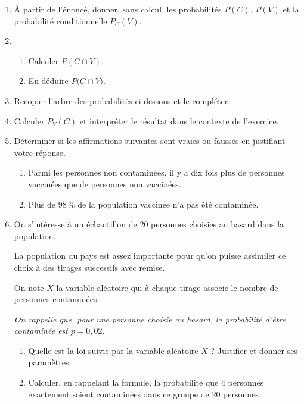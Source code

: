 \begin{enumerate}
	\item À partir de l'énoncé, donner, sans calcul, les probabilités $P(C)$, $P(V)$ et la probabilité conditionnelle $P_C(V)$.
	\item
	\begin{enumerate}
		\item Calculer $P(C \cap V)$.
		\item En déduire $P\big(\overline{C} \cap V\big)$.
	\end{enumerate}
	\item Recopier l'arbre des probabilités ci-dessous et le compléter.
	
	\begin{Centrage}
	\end{Centrage}
	\item Calculer $P_V(C)$ et interpréter le résultat dans le contexte de l'exercice.
	\item Déterminer si les affirmations suivantes sont vraies ou fausses en justifiant votre réponse.
	\begin{enumerate}
		\item \og Parmi les personnes non contaminées, il y a dix fois plus de personnes vaccinées que de personnes non vaccinées.\fg
		
		\item \og Plus de 98\,\% de la population vaccinée n'a pas été contaminée.\fg{}
	\end{enumerate}
	\item On s'intéresse à un échantillon de $20$ personnes choisies au hasard dans la population.
	
	La population du pays est assez importante pour qu'on puisse assimiler ce choix à des tirages successifs avec remise.
	
	On note $X$ la variable aléatoire qui à chaque tirage associe le nombre de personnes contaminées.
	
	\emph{On rappelle que, pour une personne choisie au hasard, la probabilité d'être contaminée est} $p = 0,02$.
	\begin{enumerate}
		\item Quelle est la loi suivie par la variable aléatoire $X$ ? Justifier et donner ses paramètres.
		\item Calculer, en rappelant la formule, la probabilité que 4 personnes exactement soient contaminées dans ce groupe de 20 personnes.
	\end{enumerate}
\end{enumerate}